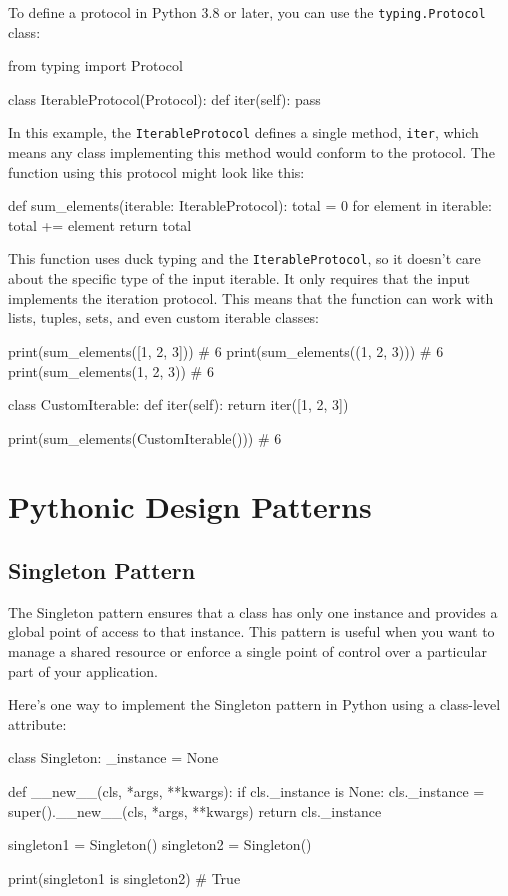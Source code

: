 \documentclass[12pt, a4paper, oneside, justified]{article}
\begin{document}
To define a protocol in Python 3.8 or later, you can use the \texttt{typing.Protocol} class:
\begin{python}
    from typing import Protocol

    class IterableProtocol(Protocol):
        def iter(self):
    pass
\end{python}
In this example, the \texttt{IterableProtocol} defines a single method, \texttt{iter}, which means 
any class implementing this method would conform to the protocol. The function using this protocol
might look like this:
\begin{python}
    def sum_elements(iterable: IterableProtocol):
        total = 0
        for element in iterable:
            total += element
        return total
\end{python}
This function uses duck typing and the \texttt{IterableProtocol}, so it doesn't care about the 
specific type of the input iterable. It only requires that the input implements the iteration protocol.
This means that the function can work with lists, tuples, sets, and even custom iterable classes:
\begin{python}
    print(sum_elements([1, 2, 3])) # 6
    print(sum_elements((1, 2, 3))) # 6
    print(sum_elements({1, 2, 3})) # 6

    class CustomIterable:
        def iter(self):
            return iter([1, 2, 3])
    
    print(sum_elements(CustomIterable())) # 6
\end{python}

\section{Pythonic Design Patterns}
\subsection{Singleton Pattern}
The Singleton pattern ensures that a class has only one instance and provides a global point of
access to that instance. This pattern is useful when you want to manage a shared resource or
enforce a single point of control over a particular part of your application.

Here's one way to implement the Singleton pattern in Python using a class-level attribute:
\begin{python}
    class Singleton:
        _instance = None

        def __new__(cls, *args, **kwargs):
            if cls._instance is None:
                cls._instance = super().__new__(cls, *args, **kwargs)
            return cls._instance

    singleton1 = Singleton()
    singleton2 = Singleton()

    print(singleton1 is singleton2) # True
\end{python}
\end{document}
